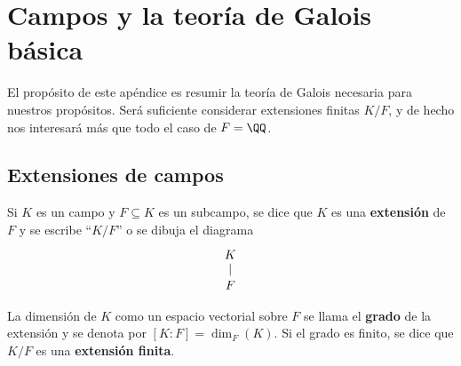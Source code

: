 \chapter{Campos y la teoría de Galois básica}

El propósito de este apéndice es resumir la teoría de Galois necesaria para
nuestros propósitos. Será suficiente considerar extensiones finitas $K/F$,
y de hecho nos interesará más que todo el caso de $F = \QQ$.


\section{Extensiones de campos}

\begin{definicion}
  Si $K$ es un campo y $F \subseteq K$ es un subcampo, se dice que $K$ es una
  \textbf{extensión} de $F$ y se escribe ``$K/F$'' o se dibuja el diagrama
  \[ \begin{tikzcd}[row sep=1em]
    K\ar[-]{d} \\
    F
  \end{tikzcd} \]

  La dimensión de $K$ como un espacio vectorial sobre $F$ se llama el
  \textbf{grado} de la extensión y se denota por $[K : F] = \dim_F (K)$.
  Si el grado es finito, se dice que $K/F$ es una \textbf{extensión finita}.
\end{definicion}

